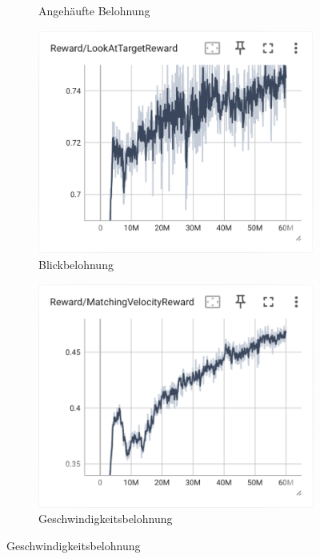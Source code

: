 \begin{figure}[H]
\begin{subfigure}{.49\textwidth}
      \caption{Angehäufte Belohnung}
      \label{fig:135_cumulative_reward}
    \end{subfigure}
     \begin{subfigure}{.49\textwidth}
      \centering  
      \includegraphics[width=\textwidth]{img/135_look_reward}
      \caption{Blickbelohnung}
      \label{fig:135_look_reward}
    \end{subfigure}
    \begin{subfigure}{.49\textwidth}
      \centering  
      \includegraphics[width=\textwidth]{img/135_vel_reward}
      \caption{Geschwindigkeitsbelohnung}

\end{subfigure}
\end{figure}
